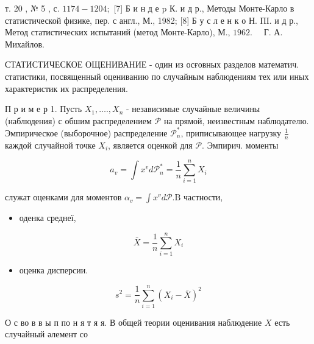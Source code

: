 \documentclass[10pt]{article}
\begin{document}
т. 20 , № 5 , с. $1174-1204 ;$ [7] Б и н д е p К. и д р., Методы Монте-Карло в статистической физике, пер. с англ., М., 1982; [8] Б у с л е н к о Н. ПI. и д р., Метод статистических испытаний (метод Монте-Карло), М., $1962 . \quad$ Г. А. Михайлов.



СТАТИСТИЧЕСКОЕ ОЩЕНИВАНИЕ - один из осғовных разделов математич. статистики, посвященный оцениванию по случайным наблюдениям тех или иных характеристик их распределения.



П р и м е р 1. Пусть $X_{1}, \ldots ., X_{n}$ - независимые случайные величины (наблюдения) с обшим распределением $\mathscr{P}$ на прямой, неизвестным наблюдателю. Эмпирическое (выборочное) распределение $\mathscr{P}_{n}^{*}$, приписывающее нагрузку $\frac{1}{n}$ каждой случайной точке $X_{i}$, является оценкой для $\mathscr{P}$. Эмпирич. моменты



\[

a_{v}=\int x^{v} d \mathscr{P}_{n}^{*}=\frac{1}{n} \sum_{i=1}^{n} X_{i}

\]



служат оценками для моментов $\alpha_{v}=\int x^{v} d \mathscr{P} . \mathrm{B}$ частности,



\begin{itemize}

  \item оденка среднеї,

\end{itemize}



\[

\bar{X}=\frac{1}{n} \sum_{i=1}^{n} X_{i}

\]



\begin{itemize}

  \item оценка дисперсии.

\end{itemize}



\[

s^{2}=\frac{1}{n} \sum_{i=1}^{n}\left(X_{i}-\bar{X}\right)^{2}

\]



О с во в в ы п по н я т я я. В общей теории оценивания наблюдение $X$ есть случайный әлемент со
\end{document}
